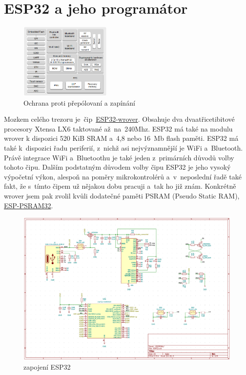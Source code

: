 \section{ESP32 a jeho programátor}


\begin{figure}
    \centering
    \includegraphics[width=0.4\textwidth]{kapitoly/obrazky/E4/ESP32/BlockDiagram.png}
    \caption{\label{fig:E4-ESP32-BlockDiagram}Ochrana proti přepólovaní a zapínání} %
\end{figure}

Mozkem celého trezoru je~čip~\href{https://www.espressif.com/sites/default/files/documentation/esp32-wrover-b_datasheet_en.pdf}{ESP32-wrover}. 
Obsahuje dva dvaatřicetibitové procesory Xtensa LX6 taktované až~na~240Mhz. ESP32 má také na modulu wrover k dispozici 520 KiB SRAM 
a~4,8 nebo 16~Mb flash paměti. ESP32 má také k~dispozici řadu periferií, z~nichž asi nejvýznamnější je WiFi a~Bluetooth. Právě integrace 
WiFi a~Bluetoothu je také jeden z~primárních důvodů volby tohoto čipu. Dalším podstatným důvodem volby čipu ESP32 je jeho vysoký výpočetní výkon, 
alespoň na poměry mikrokontrolérů a~v~neposlední řadě také fakt, že s~tímto čipem už nějakou dobu pracuji a~tak ho již znám. Konkrétně wrover 
jsem pak zvolil kvůli dodatečné paměti PSRAM (Pseudo Static RAM), \href{http://gamma.spb.ru/images/pdf/esp-psram32_datasheet_en.pdf}{ESP-PSRAM32}.


\begin{figure}[htbp] %
    \centering
    \includegraphics[width=\textwidth]{kapitoly/obrazky/E4/ESP32/sch.png}
    \caption{zapojení ESP32}
    \label{fig:E4-step-up}
\end{figure}

